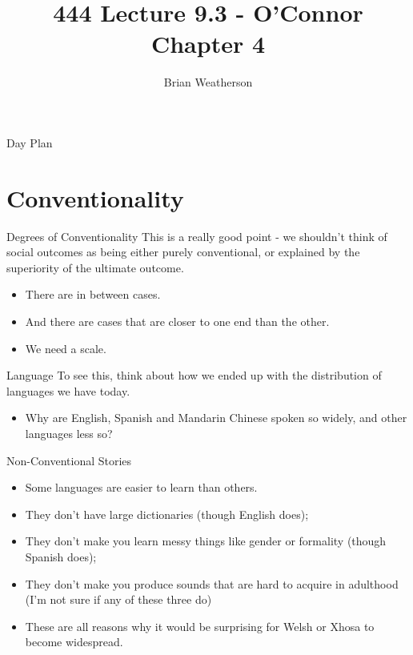 \documentclass[
  ignorenonframetext,
]{beamer}
\title{444 Lecture 9.3 - O'Connor Chapter 4}
\author{Brian Weatherson}
\date{}
\providecommand{\tightlist}{%
  \setlength{\itemsep}{0pt}\setlength{\parskip}{0pt}}
\begin{document}
\frame{\titlepage}

\begin{frame}{Day Plan}
\protect\hypertarget{day-plan}{}
\tableofcontents
\end{frame}

\hypertarget{conventionality}{%
\section{Conventionality}\label{conventionality}}

\begin{frame}{Degrees of Conventionality}
\protect\hypertarget{degrees-of-conventionality}{}
This is a really good point - we shouldn't think of social outcomes as
being either purely conventional, or explained by the superiority of the
ultimate outcome.

\begin{itemize}
\tightlist
\item
  There are in between cases.
\item
  And there are cases that are closer to one end than the other.
\item
  We need a scale.
\end{itemize}
\end{frame}

\begin{frame}{Language}
\protect\hypertarget{language}{}
To see this, think about how we ended up with the distribution of
languages we have today.

\begin{itemize}
\tightlist
\item
  Why are English, Spanish and Mandarin Chinese spoken so widely, and
  other languages less so?
\end{itemize}
\end{frame}

\begin{frame}{Non-Conventional Stories}
\protect\hypertarget{non-conventional-stories}{}
\begin{itemize}
\tightlist
\item
  Some languages are easier to learn than others.
\item
  They don't have large dictionaries (though English does);
\item
  They don't make you learn messy things like gender or formality
  (though Spanish does);
\item
  They don't make you produce sounds that are hard to acquire in
  adulthood (I'm not sure if any of these three do)
\item
  These are all reasons why it would be surprising for Welsh or Xhosa to
  become widespread.
\end{itemize}
\end{frame}
\end{document}
